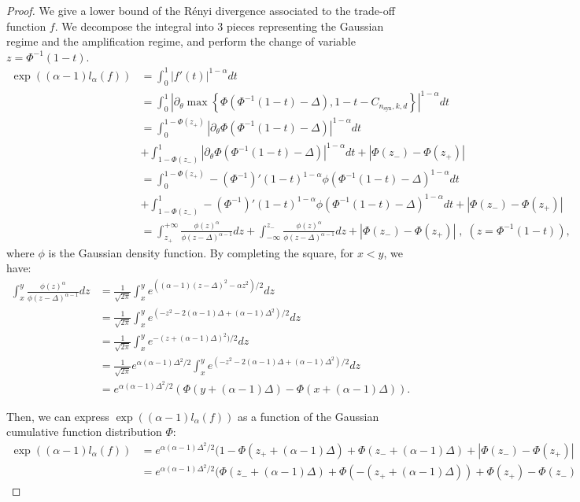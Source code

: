 \documentclass{article}
\theoremstyle{plain}
\theoremstyle{definition}
\theoremstyle{remark}
\begin{document}
\begin{proof}

We give a lower bound of the Rényi divergence associated to the trade-off function $f$. We decompose the integral into $3$ pieces representing the Gaussian regime and the amplification regime, and perform the change of variable $z = \Phi^{-1}(1-t)$.
\begin{align*}
    \exp((\alpha-1)l_\alpha(f)) &=  \int_0^1 |f'(t)|^{1-\alpha} dt\\ &=  \int_0^1 |\partial_\theta\max\left\{\Phi(\Phi^{-1}(1-t) - \Delta),1-t - C_{n_{\text{syn}},k,d}\right\}|^{1-\alpha} dt\\
    &=  \int_0^{1-\Phi(z_+)} |\partial_\theta \Phi(\Phi^{-1}(1-t) - \Delta)|^{1-\alpha}dt \\&+ \int_{1-\Phi(z_-)}^1  |\partial_\theta \Phi(\Phi^{-1}(1-t) - \Delta)|^{1-\alpha}dt + |\Phi(z_-) - \Phi(z_+)|\\
    &=  \int_0^{1-\Phi(z_+)}-(\Phi^{-1})'(1-t)^{1-\alpha} \phi(\Phi^{-1}(1-t) - \Delta)^{1-\alpha}dt \\&+ \int_{1-\Phi(z_-)}^1 -(\Phi^{-1})'(1-t)^{1-\alpha}\phi(\Phi^{-1}(1-t) - \Delta)^{1-\alpha}dt +|\Phi(z_-) - \Phi(z_+)|\\
    &= \int_{z_+}^{+\infty} \frac{\phi(z)^{\alpha}}{\phi(z-\Delta)^{\alpha-1}}dz + \int_{-\infty}^{z_-} \frac{\phi(z)^{\alpha}}{\phi(z-\Delta)^{\alpha-1}}dz +|\Phi(z_-) - \Phi(z_+)|\;,\; (z = \Phi^{-1}(1-t)),
\end{align*}
where $\phi$ is the Gaussian density function. By completing the square, for $x < y$, we have:
\begin{align*}
    \int_{x}^{y} \frac{\phi(z)^{\alpha}}{\phi(z-\Delta)^{\alpha-1}}dz &= \frac{1}{\sqrt{2\pi}}\int_{x}^{y} e^{((\alpha-1)(z-\Delta)^2-\alpha z^2)/2}dz\\
    &= \frac{1}{\sqrt{2\pi}}\int_{x}^{y} e^{(-z^2 -2(\alpha-1)\Delta + (\alpha-1)\Delta^2)/2}dz\\
    &= \frac{1}{\sqrt{2\pi}}\int_{x}^{y} e^{-(z + (\alpha-1)\Delta)^2)/2}dz\\
    &=\frac{1}{\sqrt{2\pi}}e^{\alpha(\alpha-1)\Delta^2/2}\int_{x}^{y} e^{(-z^2 -2(\alpha-1)\Delta + (\alpha-1)\Delta^2)/2}dz\\
    &= e^{\alpha(\alpha-1)\Delta^2/2} (\Phi(y + (\alpha-1)\Delta) - \Phi(x + (\alpha-1)\Delta)).
\end{align*}

Then, we can express $\exp((\alpha-1)l_\alpha(f))$ as a function of the Gaussian cumulative function distribution $\Phi$:
\begin{align*}
    \exp((\alpha-1)l_\alpha(f)) &= e^{\alpha(\alpha-1)\Delta^2/2} (1 - \Phi(z_+ + (\alpha-1)\Delta) + \Phi(z_- + (\alpha-1)\Delta)+ |\Phi(z_-) - \Phi(z_+)|\\
    &= e^{\alpha(\alpha-1)\Delta^2/2} (\Phi(z_- + (\alpha-1)\Delta) +\Phi(-(z_+ + (\alpha-1)\Delta)) +  \Phi(z_+) - \Phi(z_-)
\end{align*}


\end{proof}
\end{document}
